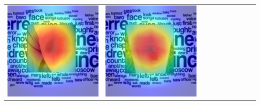 \begin{landscape}
\begin{table}[]
\begin{tabular}{@{}c c c c c c c c c c@{}}
			\includegraphics[width=.12\textheight ,keepaspectratio]{images/pretraining/gradcam/3/NASNetMobileCombinedGradCam.png} &
			\includegraphics[width=.12\textheight ,keepaspectratio]{images/pretraining/gradcam/9/NASNetMobileCombinedGradCam.png} &

\end{tabular}
\end{table}
\end{landscape}
